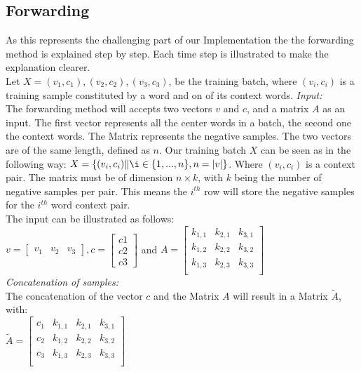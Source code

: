 \subsection{Forwarding}
As this represents the challenging part of our Implementation the the forwarding method is explained step by step. Each time step is illustrated to make the explanation clearer.\\
Let $X = {(v_1,c_1),(v_2,c_2),(v_3,c_3)}$, be the training batch, where $(v_i,c_i)$ is a training sample constituted by a word and on of its context words. 
\textit{Input:}\\
The forwarding method will accepts two vectors $v$ and $c$, and a matrix $A$ as an input. The first vector represents all the center words in a batch, the second one the context words. The Matrix represents the negative samples. The two vectors are of the same length, defined as $n$. Our training batch $X$ can be seen as in the following way:  $X = \{(v_i, c_i)\|\i \in \{1, ..., n\}, n = |v| \}$. Where $(v_i,c_i)$ is a context pair. The matrix must be of dimension $n \times k$, with $k$ being the number of negative samples per pair. This means the $i^{th}$ row will store the negative samples for the $i^{th}$ word context pair.\\
The input can be illustrated as follows: \\

 $v = \begin{bmatrix}
v_1 & v_2 & v_3
\end{bmatrix}, c = \begin{bmatrix}
c1\\
c2\\
c3\end{bmatrix}$ and $A = 
\begin{bmatrix}
k_{1,1} & k_{2,1} & k_{3,1}\\
k_{1,2} & k_{2,2} & k_{3,2}\\
k_{1,3} & k_{2,3} & k_{3,3}\\
\end{bmatrix}$\\

\textit{Concatenation of samples:}\\
The concatenation of  the vector $c$ and the Matrix $A$ will result in a Matrix $\tilde{A}$, with:\\
$\tilde{A} = \begin{bmatrix}
c_1 & k_{1,1} & k_{2,1} & k_{3,1}\\
c_2 & k_{1,2} & k_{2,2} & k_{3,2}\\
c_3 & k_{1,3} & k_{2,3}& k_{3,3}\\
\end{bmatrix}$\\

